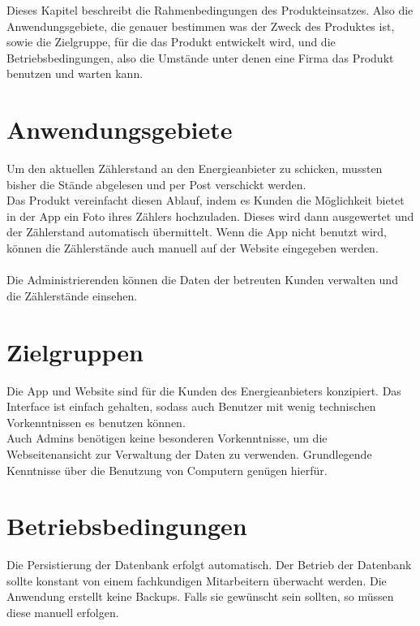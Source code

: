 Dieses Kapitel beschreibt die Rahmenbedingungen des Produkteinsatzes. Also die Anwendungsgebiete, die genauer bestimmen was der Zweck des Produktes ist, sowie die Zielgruppe, für die das Produkt entwickelt wird,
und die Betriebsbedingungen, also die Umstände unter denen eine Firma das Produkt benutzen und warten kann.

\section{Anwendungsgebiete}
	Um den aktuellen Zählerstand an den Energieanbieter zu schicken, mussten bisher die Stände abgelesen und per Post verschickt 		  
	werden. \\
	Das Produkt vereinfacht diesen Ablauf, indem es Kunden die Möglichkeit bietet in der App ein Foto ihres Zählers hochzuladen. Dieses wird dann 	
	ausgewertet und der Zählerstand  automatisch übermittelt.
	Wenn die App nicht benutzt wird, können die Zählerstände auch manuell auf der Website eingegeben werden.\\\\
	Die Administrierenden können die Daten der betreuten Kunden verwalten und die Zählerstände einsehen.
\section{Zielgruppen}
	Die App und Website sind für die Kunden des Energieanbieters konzipiert. Das Interface ist einfach gehalten, sodass auch Benutzer mit wenig technischen Vorkenntnissen es benutzen können.\\
	Auch Admins benötigen keine besonderen Vorkenntnisse, um die Webseitenansicht zur Verwaltung der Daten zu verwenden.
	Grundlegende Kenntnisse über die Benutzung von Computern genügen hierfür.
	
\section{Betriebsbedingungen}
	Die Persistierung der Datenbank erfolgt automatisch. Der Betrieb der Datenbank sollte konstant von einem fachkundigen Mitarbeitern überwacht werden.
	Die Anwendung erstellt keine Backups. Falls sie gewünscht sein sollten, so müssen diese manuell erfolgen.
	
